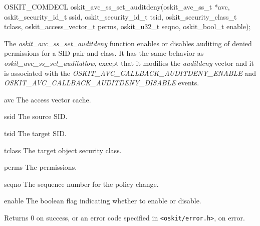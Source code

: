 \begin{apisyn}

	\funcproto OSKIT_COMDECL
	oskit_avc_ss_set_auditdeny(oskit_avc_ss_t *avc, 
		         oskit_security_id_t ssid,
			 oskit_security_id_t tsid,
                         oskit_security_class_t tclass,
			 oskit_access_vector_t perms,
			 oskit_u32_t seqno,
			 oskit_bool_t enable);
\end{apisyn}
\begin{apidesc}

The \emph{oskit\_avc\_ss\_set\_auditdeny} function enables or disables
auditing of denied permissions for a SID pair and class.  It has the
same behavior as \emph{oskit\_avc\_ss\_set\_auditallow}, except that it 
modifies the \emph{auditdeny} vector and it is associated with the
\emph{OSKIT\_AVC\_CALLBACK\_AUDITDENY\_ENABLE} and
\emph{OSKIT\_AVC\_CALLBACK\_AUDITDENY\_DISABLE} events.

\end{apidesc}
\begin{apiparm}
	\item[avc]
		The access vector cache.
	\item[ssid]
		The source SID.
	\item[tsid]
		The target SID.
	\item[tclass]
		The target object security class.
	\item[perms]
		The permissions.
	\item[seqno]
		The sequence number for the policy change.
	\item[enable]
		The boolean flag indicating whether to enable or disable.
\end{apiparm}
\begin{apiret}
	Returns 0 on success, or an error code specified in
	{\tt <oskit/error.h>}, on error.
\end{apiret}

